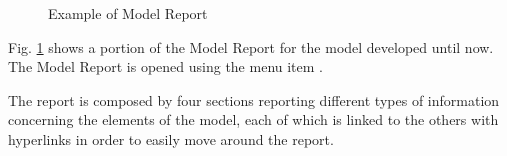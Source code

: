 \documentclass [11pt,a4paper] {book}
\begin{document}
\begin{figure}[ht]
  \centering
  \caption{Example of Model Report}
  \label{fig:report}
\end{figure}

Fig. \ref{fig:report} shows a portion of the Model Report for the model developed until
now. The Model Report is opened using the menu item .

The report is composed by four sections reporting different types of information
concerning the elements of the model, each of which is linked to the others with
hyperlinks in order to easily move around the report.
\end{document}
